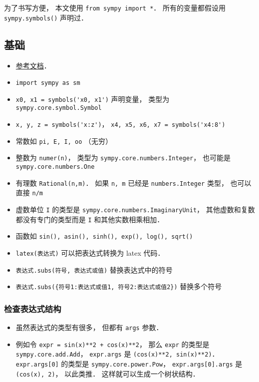 
\begin{issues}
\issueDraft
\end{issues}


为了书写方便， 本文使用 \verb|from sympy import *|． 所有的变量都假设用 \verb|sympy.symbols()| 声明过．

\subsection{基础}
\begin{itemize}
\item \href{https://docs.sympy.org/latest/reference/index.html}{参考文档}．
\item \verb|import sympy as sm|
\item \verb|x0, x1 = symbols('x0, x1')| 声明变量， 类型为 \verb|sympy.core.symbol.Symbol|
\item \verb|x, y, z = symbols('x:z')|， \verb|x4, x5, x6, x7 = symbols('x4:8')|
\item 常数如 \verb|pi, E, I, oo| （无穷）
\item 整数为 \verb|numer(n)|， 类型为 \verb|sympy.core.numbers.Integer|， 也可能是 \verb|sympy.core.numbers.One|
\item 有理数 \verb|Rational(n,m)|． 如果 \verb|n, m| 已经是 \verb|numbers.Integer| 类型， 也可以直接 \verb|n/m|
\item 虚数单位 \verb|I| 的类型是 \verb|sympy.core.numbers.ImaginaryUnit|， 其他虚数和复数都没有专门的类型而是 \verb|I| 和其他实数相乘相加．
\item 函数如 \verb|sin(), asin(), sinh(), exp(), log(), sqrt()|
\item \verb|latex(表达式)| 可以把表达式转换为 latex 代码．
\item \verb|表达式.subs(符号, 表达式或值)| 替换表达式中的符号
\item \verb|表达式.subs({符号1:表达式或值1, 符号2:表达式或值2})| 替换多个符号
\end{itemize}

\subsubsection{检查表达式结构}
\begin{itemize}
\item 虽然表达式的类型有很多， 但都有 \verb|args| 参数．
\item 例如令 \verb|expr = sin(x)**2 + cos(x)**2|， 那么 \verb|expr| 的类型是 \verb|sympy.core.add.Add|， \verb|expr.args| 是 \verb|(cos(x)**2, sin(x)**2)|． \verb|expr.args[0]| 的类型是 \verb|sympy.core.power.Pow|， \verb|expr.args[0].args| 是 \verb|(cos(x), 2)|， 以此类推． 这样就可以生成一个树状结构．
\end{itemize}


